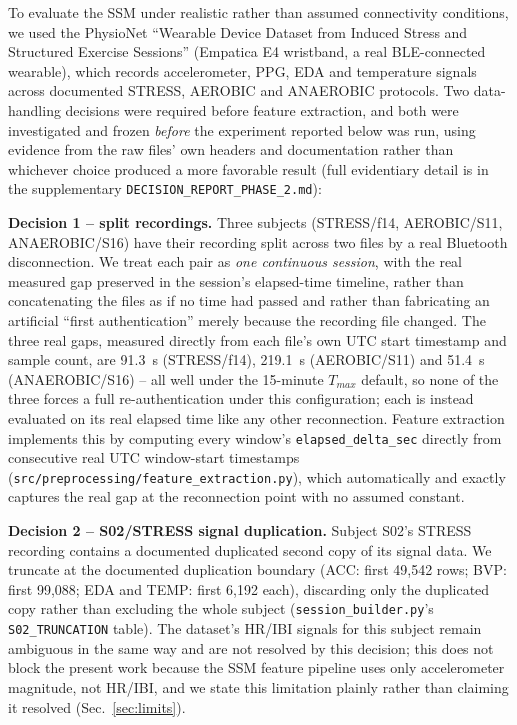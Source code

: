 \documentclass[conference]{IEEEtran}
\begin{document}
To evaluate the SSM under realistic rather than assumed connectivity
conditions, we used the PhysioNet ``Wearable Device Dataset from Induced
Stress and Structured Exercise Sessions'' \cite{physionet-wearable}
(Empatica E4 wristband, a real BLE-connected wearable), which records
accelerometer, PPG, EDA and temperature signals across documented STRESS,
AEROBIC and ANAEROBIC protocols. Two data-handling decisions were required
before feature extraction, and both were investigated and frozen
\emph{before} the experiment reported below was run, using evidence from
the raw files' own headers and documentation rather than whichever choice
produced a more favorable result (full evidentiary detail is in the
supplementary \texttt{DECISION\_REPORT\_PHASE\_2.md}):

\textbf{Decision 1 -- split recordings.} Three subjects
(STRESS/f14, AEROBIC/S11, ANAEROBIC/S16) have their recording split across
two files by a real Bluetooth disconnection. We treat each pair as
\emph{one continuous session}, with the real measured gap preserved in the
session's elapsed-time timeline, rather than concatenating the files as if
no time had passed and rather than fabricating an artificial
``first authentication'' merely because the recording file changed. The
three real gaps, measured directly from each file's own UTC start
timestamp and sample count, are 91.3~s (STRESS/f14), 219.1~s (AEROBIC/S11)
and 51.4~s (ANAEROBIC/S16) -- all well under the 15-minute $T_{max}$
default, so none of the three forces a full re-authentication under this
configuration; each is instead evaluated on its real elapsed time like any
other reconnection. Feature extraction implements this by computing every
window's \texttt{elapsed\_delta\_sec} directly from consecutive real UTC
window-start timestamps (\texttt{src/preprocessing/feature\_extraction.py}),
which automatically and exactly captures the real gap at the reconnection
point with no assumed constant.

\textbf{Decision 2 -- S02/STRESS signal duplication.} Subject S02's STRESS
recording contains a documented duplicated second copy of its signal data.
We truncate at the documented duplication boundary (ACC: first 49{,}542
rows; BVP: first 99{,}088; EDA and TEMP: first 6{,}192 each), discarding
only the duplicated copy rather than excluding the whole subject
(\texttt{session\_builder.py}'s \texttt{S02\_TRUNCATION} table). The
dataset's HR/IBI signals for this subject remain ambiguous in the same way
and are not resolved by this decision; this does not block the present
work because the SSM feature pipeline uses only accelerometer magnitude,
not HR/IBI, and we state this limitation plainly rather than claiming it
resolved (Sec.~\ref{sec:limits}).
\end{document}
